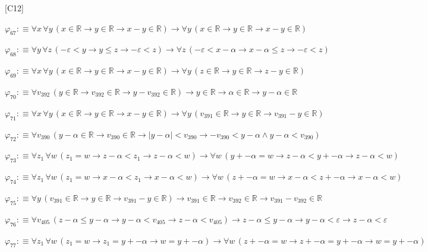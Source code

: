 \begin{fullproof}{[C12]}
\begin{abbrevlist}
\item $\varphi_{67} :\equiv \forall x\,\forall y\,(x \in \mathbb{R} \to y \in \mathbb{R} \to x - y \in \mathbb{R}) \to \forall y\,(x \in \mathbb{R} \to y \in \mathbb{R} \to x - y \in \mathbb{R})$
\item $\varphi_{68} :\equiv \forall y\,\forall z\,(-\varepsilon < y \to y \leq z \to -\varepsilon < z) \to \forall z\,(-\varepsilon < x - \alpha \to x - \alpha \leq z \to -\varepsilon < z)$
\item $\varphi_{69} :\equiv \forall x\,\forall y\,(x \in \mathbb{R} \to y \in \mathbb{R} \to x - y \in \mathbb{R}) \to \forall y\,(z \in \mathbb{R} \to y \in \mathbb{R} \to z - y \in \mathbb{R})$
\item $\varphi_{70} :\equiv \forall v_{392}\,(y \in \mathbb{R} \to v_{392} \in \mathbb{R} \to y - v_{392} \in \mathbb{R}) \to y \in \mathbb{R} \to \alpha \in \mathbb{R} \to y - \alpha \in \mathbb{R}$
\item $\varphi_{71} :\equiv \forall x\,\forall y\,(x \in \mathbb{R} \to y \in \mathbb{R} \to x - y \in \mathbb{R}) \to \forall y\,(v_{391} \in \mathbb{R} \to y \in \mathbb{R} \to v_{391} - y \in \mathbb{R})$
\item $\varphi_{72} :\equiv \forall v_{390}\,(y - \alpha \in \mathbb{R} \to v_{390} \in \mathbb{R} \to \lvert y - \alpha \rvert < v_{390} \to -v_{390} < y - \alpha \land y - \alpha < v_{390})$
\item $\varphi_{73} :\equiv \forall z_{1}\,\forall w\,(z_{1} = w \to z - \alpha < z_{1} \to z - \alpha < w) \to \forall w\,(y + -\alpha = w \to z - \alpha < y + -\alpha \to z - \alpha < w)$
\item $\varphi_{74} :\equiv \forall z_{1}\,\forall w\,(z_{1} = w \to x - \alpha < z_{1} \to x - \alpha < w) \to \forall w\,(z + -\alpha = w \to x - \alpha < z + -\alpha \to x - \alpha < w)$
\item $\varphi_{75} :\equiv \forall y\,(v_{391} \in \mathbb{R} \to y \in \mathbb{R} \to v_{391} - y \in \mathbb{R}) \to v_{391} \in \mathbb{R} \to v_{392} \in \mathbb{R} \to v_{391} - v_{392} \in \mathbb{R}$
\item $\varphi_{76} :\equiv \forall v_{405}\,(z - \alpha \leq y - \alpha \to y - \alpha < v_{405} \to z - \alpha < v_{405}) \to z - \alpha \leq y - \alpha \to y - \alpha < \varepsilon \to z - \alpha < \varepsilon$
\item $\varphi_{77} :\equiv \forall z_{1}\,\forall w\,(z_{1} = w \to z_{1} = y + -\alpha \to w = y + -\alpha) \to \forall w\,(z + -\alpha = w \to z + -\alpha = y + -\alpha \to w = y + -\alpha)$

\end{abbrevlist}
\end{fullproof}
